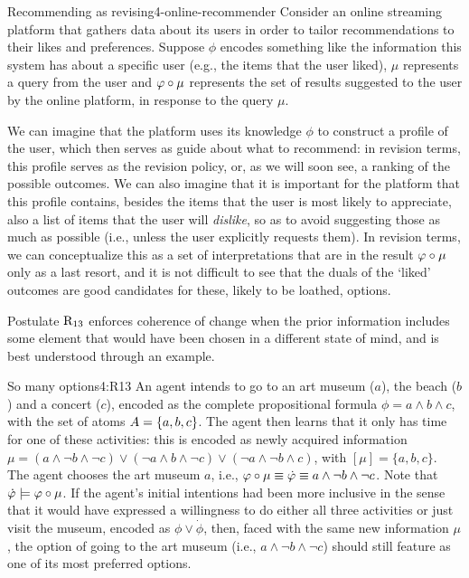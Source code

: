 \begin{xmpl}{Recommending as revising}{4-online-recommender}
	Consider an online streaming platform that gathers data about its users
	in order to tailor recommendations to their likes and preferences.
	Suppose $\phi$ encodes something like the information this system 
	has about a specific user (e.g., the items that the user liked), 
	$\mu$ represents a query from the user
	and $\varphi\circ\mu$ represents the set of results suggested to the user by 
	the online platform, in response to the query $\mu$.

	We can imagine that the platform uses its knowledge $\phi$ to construct 
	a profile of the user, which then serves as guide about what to recommend:
	in revision terms, this profile serves as the revision policy, or, 
	as we will soon see, a ranking of the possible outcomes.
	We can also imagine that it is important for the platform that 
	this profile contains, besides the items that the 
	user is most likely to appreciate, also a list of items that the user will 
	\emph{dislike}, so as to avoid suggesting those as much as possible
	(i.e., unless the user explicitly requests them).
	In revision terms, we can conceptualize this as a set of interpretations that 
	are in the result $\varphi\circ\mu$ only as a last resort,
	and it is not difficult to see that the duals of the `liked' outcomes 
	are good candidates for these, likely to be loathed, options.
\end{xmpl}

Postulate $\mathrm{R}_{13}$ enforces coherence of change 
when the prior information includes some element that would have been chosen in a different state of mind,
and is best understood through an example.

\begin{xmpl}{So many options}{4:R13}
	An agent intends to go to an art museum ($a$),
	the beach ($b$) and a concert ($c$),
	encoded as the complete propositional formula $\phi=a\land b\land c$,
	with the set of atoms $A=\{a,b,c\}$.
	The agent then learns that it only has time
	for one of these activities: this is encoded as newly acquired information
	$\mu = (a\land\lnot b\land \lnot c)\lor (\lnot a\land b\land \lnot c)\lor (\lnot a\land\lnot b\land c)$,
	with $[\mu]=\{a,b,c\}$.
	The agent chooses the art museum $a$, i.e.,
	$\varphi\circ\mu\equiv\dot{\varphi}\equiv a\land\lnot b\land\lnot c$.
	Note that $\dot{\varphi}\models\varphi\circ\mu$.
	If the agent's initial intentions had been more inclusive
	in the sense that it would have expressed a willingness to do either all three activities
	or just visit the museum, 
	encoded as $\phi\lor\dot{\phi}$,
	then, faced with the same new information $\mu$, 
	the option of going to the art museum
	(i.e., $a\land\lnot b\land\lnot c$) should still feature as one of its most preferred options.
\end{xmpl}

